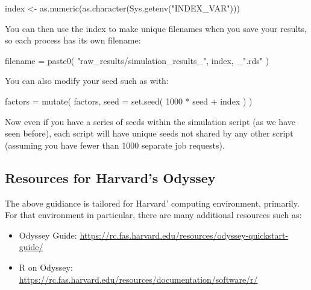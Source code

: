\documentclass[
]{book}
\newenvironment{Shaded}{\begin{snugshade}}{\end{snugshade}}
\newcommand{\AttributeTok}[1]{\textcolor[rgb]{0.77,0.63,0.00}{#1}}
\newcommand{\DecValTok}[1]{\textcolor[rgb]{0.00,0.00,0.81}{#1}}
\newcommand{\FunctionTok}[1]{\textcolor[rgb]{0.00,0.00,0.00}{#1}}
\newcommand{\NormalTok}[1]{#1}
\newcommand{\OtherTok}[1]{\textcolor[rgb]{0.56,0.35,0.01}{#1}}
\newcommand{\SpecialCharTok}[1]{\textcolor[rgb]{0.00,0.00,0.00}{#1}}
\newcommand{\StringTok}[1]{\textcolor[rgb]{0.31,0.60,0.02}{#1}}
\providecommand{\tightlist}{%
  \setlength{\itemsep}{0pt}\setlength{\parskip}{0pt}}
\begin{document}
\begin{Shaded}
\begin{Highlighting}[]
\NormalTok{index }\OtherTok{\textless{}{-}} \FunctionTok{as.numeric}\NormalTok{(}\FunctionTok{as.character}\NormalTok{(}\FunctionTok{Sys.getenv}\NormalTok{(}\StringTok{"INDEX\_VAR"}\NormalTok{)))}
\end{Highlighting}
\end{Shaded}

You can then use the index to make unique filenames when you save your results, so each process has its own filename:

\begin{Shaded}
\begin{Highlighting}[]
\NormalTok{filename }\OtherTok{=} \FunctionTok{paste0}\NormalTok{( }\StringTok{"raw\_results/simulation\_results\_"}\NormalTok{, index, \_}\StringTok{".rds"}\NormalTok{ )}
\end{Highlighting}
\end{Shaded}

You can also modify your seed such as with:

\begin{Shaded}
\begin{Highlighting}[]
\NormalTok{factors }\OtherTok{=} \FunctionTok{mutate}\NormalTok{( factors,}
                  \AttributeTok{seed =} \FunctionTok{set.seed}\NormalTok{( }\DecValTok{1000} \SpecialCharTok{*}\NormalTok{ seed }\SpecialCharTok{+}\NormalTok{ index ) )}
\end{Highlighting}
\end{Shaded}

Now even if you have a series of seeds within the simulation script (as we have seen before), each script will have unique seeds not shared by any other script (assuming you have fewer than 1000 separate job requests).

\hypertarget{resources-for-harvards-odyssey}{%
\subsection{Resources for Harvard's Odyssey}\label{resources-for-harvards-odyssey}}

The above guidiance is tailored for Harvard' computing environment, primarily.
For that environment in particular, there are many additional resources such as:

\begin{itemize}
\tightlist
\item
  Odyssey Guide: \url{https://rc.fas.harvard.edu/resources/odyssey-quickstart-guide/}
\item
  R on Odyssey: \url{https://rc.fas.harvard.edu/resources/documentation/software/r/}
\end{itemize}
\end{document}
